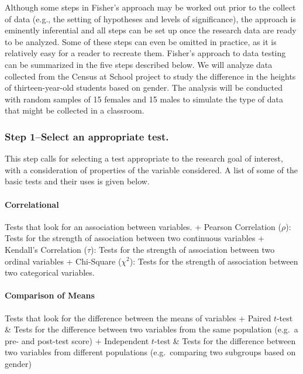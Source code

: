 \documentclass[
]{book}
\theoremstyle{definition}
\theoremstyle{definition}
\theoremstyle{definition}
\theoremstyle{definition}
\theoremstyle{remark}
\begin{document}
Although some steps in Fisher's approach may be worked out prior to the collect of data (e.g., the setting of hypotheses and levels of significance), the approach is eminently inferential and all steps can be set up once the research data are ready to be analyzed. Some of these steps can even be omitted in practice, as it is relatively easy for a reader to recreate them. Fisher's approach to data testing can be summarized in the five steps described below. We will analyze data collected from the Census at School project to study the difference in the heights of thirteen-year-old students based on gender. The analysis will be conducted with random samples of 15 females and 15 males to simulate the type of data that might be collected in a classroom.

\hypertarget{step-1select-an-appropriate-test.}{%
\subsubsection*{Step 1--Select an appropriate test.}\label{step-1select-an-appropriate-test.}}

This step calls for selecting a test appropriate to the research goal of interest, with a consideration of properties of the variable considered. A list of some of the basic tests and their uses is given below.

\hypertarget{correlational}{%
\paragraph*{Correlational}\label{correlational}}

Tests that look for an association between variables.
+ Pearson Correlation (\(\rho\)): Tests for the strength of association between two continuous variables
+ Kendall's Correlation (\(\tau\)): Tests for the strength of association between two ordinal variables
+ Chi-Square (\(\chi^2\)): Tests for the strength of association between two categorical variables.

\hypertarget{comparison-of-means}{%
\paragraph*{Comparison of Means}\label{comparison-of-means}}

Tests that look for the difference between the means of variables
+ Paired \(t\)-test \& Tests for the difference between two variables from the same population (e.g.~a pre- and post-test score)
+ Independent \(t\)-test \& Tests for the difference between two variables from different populations (e.g.~comparing two subgroups based on gender)
\end{document}
